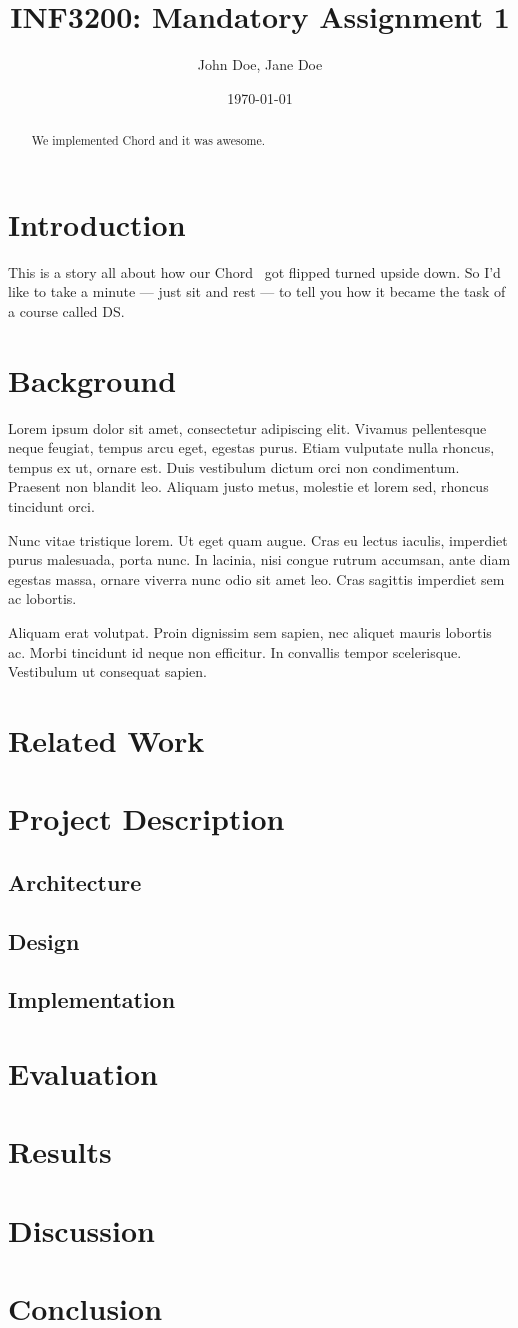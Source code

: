 \documentclass[
    a4paper,
    twocolumn,
]{article}
\title{INF3200: Mandatory Assignment 1}
\author{John Doe, Jane Doe}
\date{\today}
\begin{document}
\maketitle

\begin{abstract}
    We implemented Chord and it was awesome.
\end{abstract}

\section{Introduction}

This is a story all about how
our Chord~\cite{Stoica2003} got flipped
turned upside down.
So I'd like to take a minute
--- just sit and rest ---
to tell you how it became the task
of a course called DS.

\section{Background}

Lorem ipsum dolor sit amet, consectetur adipiscing elit.
Vivamus pellentesque neque feugiat, tempus arcu eget, egestas purus.
Etiam vulputate nulla rhoncus, tempus ex ut, ornare est.
Duis vestibulum dictum orci non condimentum.
Praesent non blandit leo.
Aliquam justo metus, molestie et lorem sed, rhoncus tincidunt orci.

Nunc vitae tristique lorem.
Ut eget quam augue.
Cras eu lectus iaculis, imperdiet purus malesuada, porta nunc.
In lacinia, nisi congue rutrum accumsan, ante diam egestas massa, ornare viverra nunc odio sit amet leo.
Cras sagittis imperdiet sem ac lobortis.

Aliquam erat volutpat.
Proin dignissim sem sapien, nec aliquet mauris lobortis ac.
Morbi tincidunt id neque non efficitur.
In convallis tempor scelerisque.
Vestibulum ut consequat sapien.

\section{Related Work}
\section{Project Description}
\subsection{Architecture}
\subsection{Design}
\subsection{Implementation}
\section{Evaluation}
\section{Results}
\section{Discussion}
\section{Conclusion}

\printbibliography
\end{document}
